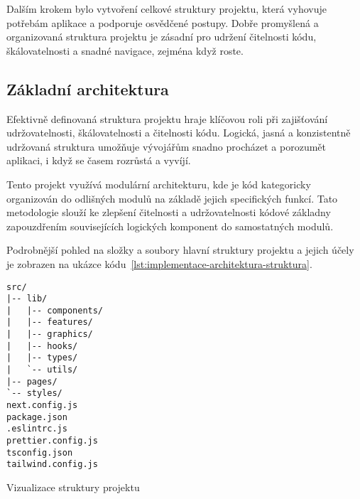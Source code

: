 Dalším krokem bylo vytvoření celkové struktury projektu, která vyhovuje potřebám aplikace a podporuje osvědčené postupy.
Dobře promyšlená a organizovaná struktura projektu je zásadní pro udržení čitelnosti kódu, škálovatelnosti a snadné navigace, zejména když  roste.

\subsection{Základní architektura}
\label{subsec:implementace-architektura-zakladni}
Efektivně definovaná struktura projektu hraje klíčovou roli při zajišťování udržovatelnosti, škálovatelnosti a čitelnosti kódu.
Logická, jasná a konzistentně udržovaná struktura umožňuje vývojářům snadno procházet a porozumět aplikaci, i když se  časem rozrůstá a vyvíjí.

Tento projekt využívá modulární architekturu, kde je kód kategoricky organizován do odlišných modulů na základě jejich specifických funkcí.
Tato metodologie slouží ke zlepšení čitelnosti a udržovatelnosti kódové základny zapouzdřením souvisejících logických komponent do samostatných modulů\cite{p_article_react_folder_structure}.

Podrobnější pohled na složky a soubory hlavní struktury projektu a jejich účely je zobrazen na ukázce kódu~\ref{lst:implementace-architektura-struktura}.

\begin{listing}[!h]
\begin{verbatim}
src/
|-- lib/
|   |-- components/
|   |-- features/
|   |-- graphics/
|   |-- hooks/
|   |-- types/
|   `-- utils/
|-- pages/
`-- styles/
next.config.js
package.json
.eslintrc.js
prettier.config.js
tsconfig.json
tailwind.config.js
\end{verbatim}
\caption{Vizualizace struktury projektu}
\label{lst:implementace-architektura-struktura}
\end{listing}


